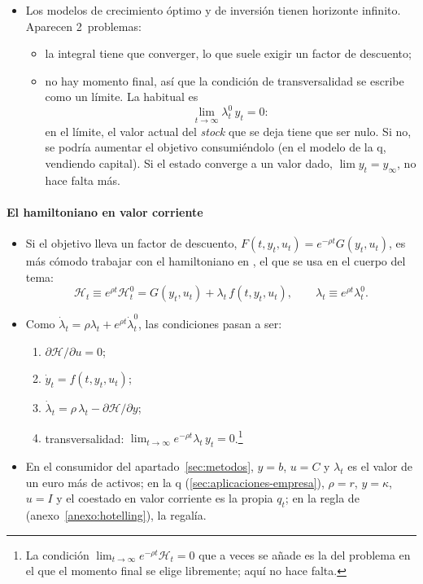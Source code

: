 \documentclass[11pt]{article}
\begin{document}
\begin{itemize}
\item Los modelos de crecimiento óptimo  y de inversión  tienen horizonte infinito. Aparecen 2~problemas:
  \begin{itemize}
  \item la integral tiene que converger, lo que suele exigir un factor de descuento;
  \item no hay momento final, así que la condición de transversalidad se escribe como un límite. La habitual es
    \begin{equation*}
    \lim_{t\to\infty}\lambda^0_t\,y_t=0:
    \end{equation*}
    en el límite, el valor actual del \emph{stock} que se deja tiene que ser nulo. Si no, se podría aumentar el objetivo consumiéndolo (en el modelo de la q, vendiendo capital). Si el estado converge a un valor dado, $\lim y_t=y_{\infty}$, no hace falta más.
  \end{itemize}
\end{itemize}

\paragraph{El hamiltoniano en valor corriente}

\begin{itemize}
\item Si el objetivo lleva un factor de descuento, $F(t,y_t,u_t)=e^{-\rho t}G(y_t,u_t)$, es más cómodo trabajar con el hamiltoniano en , el que se usa en el cuerpo del tema:
  \begin{equation*}
  \mathcal{H}_t\equiv e^{\rho t}\mathcal{H}^0_t=G(y_t,u_t)+\lambda_t\,f(t,y_t,u_t),\qquad \lambda_t\equiv e^{\rho t}\lambda^0_t.
  \end{equation*}
\item Como $\dot\lambda_t=\rho\lambda_t+e^{\rho t}\dot\lambda^0_t$, las condiciones pasan a ser:
  \begin{enumerate}
  \item $\partial\mathcal{H}/\partial u=0$;
  \item $\dot y_t=f(t,y_t,u_t)$;
  \item $\dot\lambda_t=\rho\,\lambda_t-\partial\mathcal{H}/\partial y$;
  \item transversalidad: $\lim_{t\to\infty}e^{-\rho t}\lambda_t\,y_t=0$.\footnote{La condición $\lim_{t\to\infty}e^{-\rho t}\mathcal{H}_t=0$ que a veces se añade es la del problema en el que el momento final se elige libremente; aquí no hace falta.}
  \end{enumerate}
\item En el consumidor del apartado~\ref{sec:metodos}, $y=b$, $u=C$ y $\lambda_t$ es el valor de un euro más de activos; en la q (\ref{sec:aplicaciones-empresa}), $\rho=r$, $y=\kappa$, $u=I$ y el coestado en valor corriente es la propia $q_t$; en la regla de  (anexo~\ref{anexo:hotelling}), la regalía.
\end{itemize}
\end{document}
